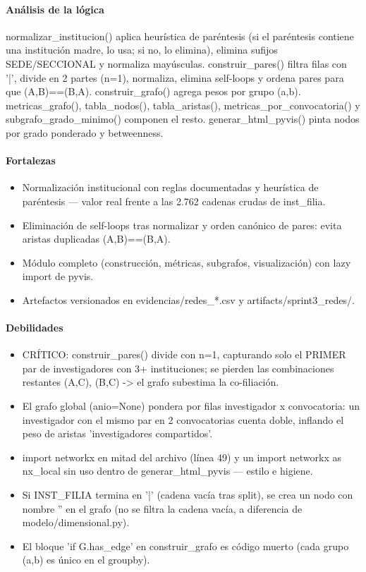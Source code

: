 \paragraph{Análisis de la lógica}
normalizar\_institucion() aplica heurística de paréntesis (si el paréntesis contiene una institución madre, lo usa; si no, lo elimina), elimina sufijos SEDE/SECCIONAL y normaliza mayúsculas. construir\_pares() filtra filas con '|', divide en 2 partes (n=1), normaliza, elimina self-loops y ordena pares para que (A,B)==(B,A). construir\_grafo() agrega pesos por grupo (a,b). metricas\_grafo(), tabla\_nodos(), tabla\_aristas(), metricas\_por\_convocatoria() y subgrafo\_grado\_minimo() componen el resto. generar\_html\_pyvis() pinta nodos por grado ponderado y betweenness.

\paragraph{Fortalezas}
\begin{itemize}
  \item Normalización institucional con reglas documentadas y heurística de paréntesis --- valor real frente a las 2.762 cadenas crudas de inst\_filia.
  \item Eliminación de self-loops tras normalizar y orden canónico de pares: evita aristas duplicadas (A,B)==(B,A).
  \item Módulo completo (construcción, métricas, subgrafos, visualización) con lazy import de pyvis.
  \item Artefactos versionados en evidencias/redes\_*.csv y artifacts/sprint3\_redes/.
\end{itemize}

\paragraph{Debilidades}
\begin{itemize}
  \item CRÍTICO: construir\_pares() divide con n=1, capturando solo el PRIMER par de investigadores con 3+ instituciones; se pierden las combinaciones restantes (A,C), (B,C) -> el grafo subestima la co-filiación.
  \item El grafo global (anio=None) pondera por filas investigador x convocatoria: un investigador con el mismo par en 2 convocatorias cuenta doble, inflando el peso de aristas 'investigadores compartidos'.
  \item import networkx en mitad del archivo (línea 49) y un import networkx as nx\_local sin uso dentro de generar\_html\_pyvis --- estilo e higiene.
  \item Si INST\_FILIA termina en '|' (cadena vacía tras split), se crea un nodo con nombre '' en el grafo (no se filtra la cadena vacía, a diferencia de modelo/dimensional.py).
  \item El bloque 'if G.has\_edge' en construir\_grafo es código muerto (cada grupo (a,b) es único en el groupby).
\end{itemize}

